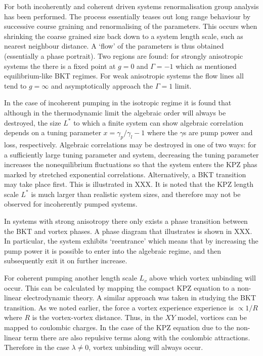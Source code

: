 \documentclass[letterpaper, 10 pt, conference]{IEEEtran}  %
\begin{document}
For both incoherently and coherent driven systems renormalisation group analysis has been performed.
The process essentially teases out long range behaviour by successive course graining and renormalising of the parameters. 
This occurs when shrinking the coarse grained size back down to a system length scale, such as nearest neighbour distance.
A `flow' of the parameters is thus obtained (essentially a phase portrait).
Two regions are found: for strongly anisotropic systems the there is a fixed point at $g=0$ and $\Gamma = -1$ which as mentioned equilibrium-like BKT regimes. 
For weak anisotropic systems the flow lines all tend to $g= \infty$ and asymptotically approach the $\Gamma =1$ limit. 

In the case of incoherent pumping in the isotropic regime it is found that although in the thermodynamic limit the algebraic order will always be destroyed, the size $L^*$ to which a finite system can show algebraic correlation depends on a tuning parameter $x= \gamma_p / \gamma_l -1$ where the $\gamma$s are pump power and loss, respectively. 
Algebraic correlations may be destroyed in one of two ways: for a sufficiently large tuning parameter and system, decreasing the tuning parameter increases the nonequilibrium fluctuations so that the system enters the KPZ phas marked by stretched exponential correlations. 
Alternatively, a BKT transition may take place first. 
This is illustrated in XXX. 
It is noted that the KPZ length scale $L^*$ is much larger than realistic system sizes, and therefore may not be observed for incoherently pumped systems. 

In systems with strong anisotropy there only exists a phase transition between the BKT and vortex phases.
A phase diagram that illustrates is shown in XXX.
In particular, the system exhibits `reentrance' which means that by increasing the pump power it is possible to enter into the algebraic regime, and then subsequently exit it on further increase.

For coherent pumping another length scale $L_v$ above which vortex unbinding will occur. 
This can be calculated by mapping the compact KPZ equation to a non-linear electrodynamic theory.
A similar approach was taken in studying the BKT transition. 
As we noted earlier, the force a vortex experience experience is $\propto 1/R$ where $R$ is the vortex-vortex distance. 
Thus, in the $XY$ model, vortices can be mapped to coulombic charges. 
In the case of the KPZ equation due to the non-linear term there are also repulsive terms along with the coulombic attractions. 
Therefore in the case $\lambda \neq 0$, vortex unbinding will always occur. 
\end{document}
